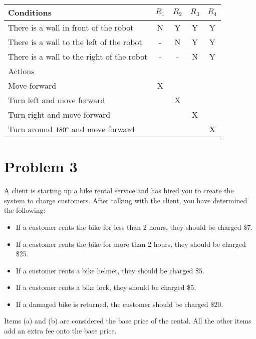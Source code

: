 \documentclass{article}
\begin{document}
    \begin{center}
        \begin{tabular} {|l|c|c|c|c|}
            \hline
            Conditions & $R_1$ & $R_2$ & $R_3$ & $R_4$ \\
            \hline
            There is a wall in front of the robot & N & Y & Y & Y \\
            There is a wall to the left of the robot & - & N & Y & Y \\
            There is a wall to the right of the robot & - & - & N & Y \\
            \hline
            Actions & & & & \\
            \hline
            Move forward & X & & & \\
            Turn left and move forward & & X & & \\
            Turn right and move forward & & & X & \\
            Turn around $180\degree$ and move forward & & & & X \\
            \hline
        \end{tabular}
    \end{center}

    \section*{Problem 3}

    A client is starting up a bike rental service and has hired you to create the system to
    charge customers. After talking with the client, you have determined the following:
    \begin{itemize}
        \item 
        If a customer rents the bike for less than 2 hours, they should be charged \$7.
        \item
        If a customer rents the bike for more than 2 hours, they should be charged \$25.
        \item
        If a customer rents a bike helmet, they should be charged \$5.
        \item
        If a customer rents a bike lock, they should be charged \$5.
        \item
        If a damaged bike is returned, the customer should be charged \$20.
    \end{itemize}
    Items (a) and (b) are considered the base price of the rental. All the other items add an
    extra fee onto the base price.
\end{document}
